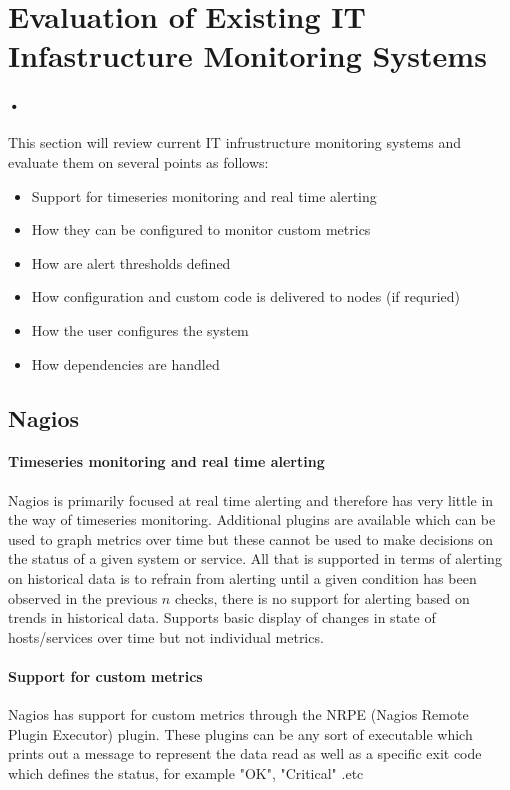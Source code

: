 \documentclass[10pt]{article}
\begin{document}
	\section{Evaluation of Existing IT Infastructure Monitoring Systems}
		\paragraph{•}
		This section will review current IT infrustructure monitoring systems and evaluate them on
		several points as follows:
		\begin{itemize}
			\item Support for timeseries monitoring and real time alerting
			\item How they can be configured to monitor custom metrics
			\item How are alert thresholds defined
			\item How configuration and custom code is delivered to nodes (if requried)
			\item How the user configures the system
			\item How dependencies are handled
		\end{itemize}
	
	\subsection{Nagios}
	\paragraph{Timeseries monitoring and real time alerting}
	Nagios is primarily focused at real time alerting and therefore has very little in the way of 
	timeseries monitoring.  Additional plugins are available which can be used to graph metrics
	over time but these cannot be used to make decisions on the status of a given system or service.
	All that is supported in terms of alerting on historical data is to refrain from alerting until
	a given condition has been observed in the previous $n$ checks, there is no support for alerting
	based on trends in historical data.  Supports basic display of changes in state of hosts/services
	over time but not individual metrics.
	
	\paragraph{Support for custom metrics}
	Nagios has support for custom metrics through the NRPE (Nagios Remote Plugin Executor) plugin.
	These plugins can be any sort of executable which prints out a message to represent the data read
	as well as a specific exit code which defines the status, for example "OK", "Critical"
	.etc
	
\end{document}
